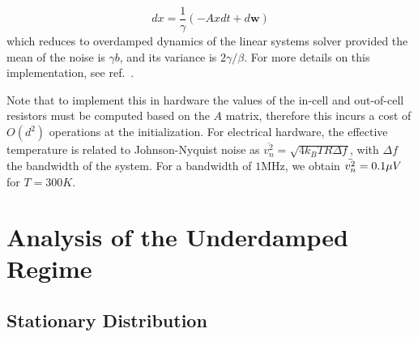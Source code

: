 \documentclass[prx,onecolumn,floatfix,longbibliography,notitlepage, nofootinbib,12pt]{revtex4-2}
\begin{document}
\begin{appendix}
\begin{equation}
   dx =  \frac{1}{\gamma}(-Axdt + d\mathbf{w})
\end{equation}
which reduces to overdamped dynamics of the linear systems solver provided the mean of the noise is $\gamma b$, and its variance is $2\gamma/\beta$. For more details on this implementation, see ref.~\cite{coles2023thermodynamic}. 



Note that to implement this in hardware the values of the in-cell and out-of-cell resistors must be computed based on the $A$ matrix, therefore this incurs a cost of $O(d^2)$ operations at the initialization. For electrical hardware, the effective temperature is related to Johnson-Nyquist noise as $\overline{v_n^2} = \sqrt{4k_BTR\Delta f}$, with $\Delta f$ the bandwidth of the system. For a bandwidth of $1 \text{MHz}$, we obtain $\Bar{v_n^2} = 0.1 \mu V$ for $T = 300K$.



\section{Analysis of the Underdamped Regime}
\label{app:UDL}

\subsection{Stationary Distribution }


\end{appendix}
\end{document}

